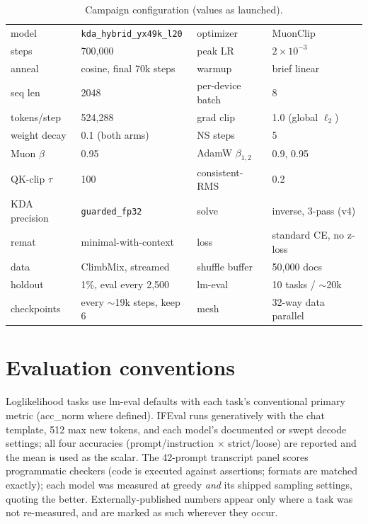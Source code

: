 \begin{table}[H]
\centering
\small
\caption{Campaign configuration (values as launched).}
\begin{tabular}{ll@{\qquad}ll}
\toprule
model & \texttt{kda\_hybrid\_yx49k\_l20} & optimizer & MuonClip \\
steps & 700{,}000 & peak LR & $2\times10^{-3}$ \\
anneal & cosine, final 70k steps & warmup & brief linear \\
seq len & 2048 & per-device batch & 8 \\
tokens/step & 524{,}288 & grad clip & 1.0 (global $\ell_2$) \\
weight decay & 0.1 (both arms) & NS steps & 5 \\
Muon $\beta$ & 0.95 & AdamW $\beta_{1,2}$ & 0.9, 0.95 \\
QK-clip $\tau$ & 100 & consistent-RMS & 0.2 \\
KDA precision & \texttt{guarded\_fp32} & solve & inverse, 3-pass (v4) \\
remat & minimal-with-context & loss & standard CE, no z-loss \\
data & ClimbMix, streamed & shuffle buffer & 50{,}000 docs \\
holdout & 1\%, eval every 2{,}500 & lm-eval & 10 tasks / $\sim$20k \\
checkpoints & every $\sim$19k steps, keep 6 & mesh & 32-way data parallel \\
\bottomrule
\end{tabular}
\end{table}

\section{Evaluation conventions}
\label{app:conventions}

Loglikelihood tasks use lm-eval defaults with each task's conventional
primary metric (acc\_norm where defined). IFEval runs generatively with
the chat template, 512 max new tokens, and each model's documented or
swept decode settings; all four accuracies (prompt/instruction $\times$
strict/loose) are reported and the mean is used as the scalar. The
42-prompt transcript panel scores programmatic checkers (code is
executed against assertions; formats are matched exactly); each model
was measured at greedy \emph{and} its shipped sampling settings, quoting
the better. Externally-published numbers appear only where a task was
not re-measured, and are marked as such wherever they occur.
